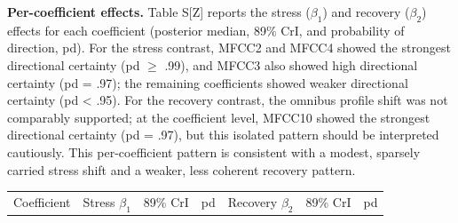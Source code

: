 \documentclass[
  english,
  man,floatsintext]{apa6}
\newcounter{none} %
\begin{document}
\textbf{Per-coefficient effects.} Table S{[}Z{]} reports the stress (\(\beta_1\)) and recovery (\(\beta_2\)) effects for each coefficient (posterior median, 89\% CrI, and probability of direction, pd). For the stress contrast, MFCC2 and MFCC4 showed the strongest directional certainty (pd \(\geq\) .99), and MFCC3 also showed high directional certainty (pd = .97); the remaining coefficients showed weaker directional certainty (pd \textless{} .95). For the recovery contrast, the omnibus profile shift was not comparably supported; at the coefficient level, MFCC10 showed the strongest directional certainty (pd = .97), but this isolated pattern should be interpreted cautiously. This per-coefficient pattern is consistent with a modest, sparsely carried stress shift and a weaker, less coherent recovery pattern.

{\def\LTcaptype{none} %
\begin{longtable}[]{@{}
  >{\raggedright\arraybackslash}p{}
  >{\raggedright\arraybackslash}p{}
  >{\raggedright\arraybackslash}p{}
  >{\raggedright\arraybackslash}p{}
  >{\raggedright\arraybackslash}p{}
  >{\raggedright\arraybackslash}p{}
  >{\raggedright\arraybackslash}p{}@{}}
\toprule\noalign{}
\begin{minipage}[b]{\linewidth}\raggedright
Coefficient
\end{minipage} & \begin{minipage}[b]{\linewidth}\raggedright
Stress \(\beta_1\)
\end{minipage} & \begin{minipage}[b]{\linewidth}\raggedright
89\% CrI
\end{minipage} & \begin{minipage}[b]{\linewidth}\raggedright
pd
\end{minipage} & \begin{minipage}[b]{\linewidth}\raggedright
Recovery \(\beta_2\)
\end{minipage} & \begin{minipage}[b]{\linewidth}\raggedright
89\% CrI
\end{minipage} & \begin{minipage}[b]{\linewidth}\raggedright
pd
\end{minipage} \\

\end{longtable}}
\end{document}
